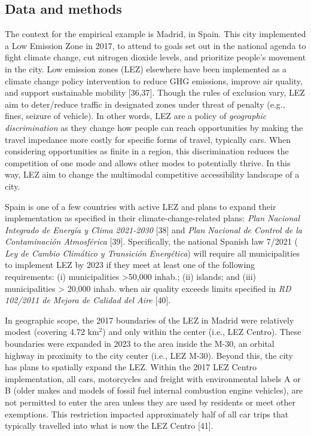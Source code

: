 \documentclass[10pt,letterpaper]{article}
\begin{document}
\hypertarget{data-and-methods}{%
\subsection{Data and methods}\label{data-and-methods}}

The context for the empirical example is Madrid, in Spain. This city
implemented a Low Emission Zone in 2017, to attend to goals set out in
the national agenda to fight climate change, cut nitrogen dioxide
levels, and prioritize people's movement in the city. Low emission zones
(LEZ) elsewhere have been implemented as a climate change policy
intervention to reduce GHG emissions, improve air quality, and support
sustainable mobility {[}36,37{]}. Though the rules of exclusion vary,
LEZ aim to deter/reduce traffic in designated zones under threat of
penalty (e.g., fines, seizure of vehicle). In other words, LEZ are a
policy of \emph{geographic discrimination} as they change how people can
reach opportunities by making the travel impedance more costly for
specific forms of travel, typically cars. When considering opportunities
as finite in a region, this discrimination reduces the competition of
one mode and allows other modes to potentially thrive. In this way, LEZ
aim to change the multimodal competitive accessibility landscape of a
city.

Spain is one of a few countries with active LEZ and plans to expand
their implementation as specified in their climate-change-related plans:
\emph{Plan Nacional Integrado de Energía y Clima 2021-2030} {[}38{]} and
\emph{Plan Nacional de Control de la Contaminación Atmosférica}
{[}39{]}. Specifically, the national Spanish law 7/2021 ( \emph{Ley de
Cambio Climático y Transición Energética}) will require all
municipalities to implement LEZ by 2023 if they meet at least one of the
following requirements: (i) municipalities \textgreater50,000 inhab.;
(ii) islands; and (iii) municipalities \textgreater{} 20,000 inhab. when
air quality exceeds limits specified in \emph{RD 102/2011 de Mejora de
Calidad del Aire} {[}40{]}.

In geographic scope, the 2017 boundaries of the LEZ in Madrid were
relatively modest (covering 4.72 km\(^2\)) and only within the center
(i.e., LEZ Centro). These boundaries were expanded in 2023 to the area
inside the M-30, an orbital highway in proximity to the city center
(i.e., LEZ M-30). Beyond this, the city has plans to spatially expand
the LEZ. Within the 2017 LEZ Centro implementation, all cars,
motorcycles and freight with environmental labels A or B (older makes
and models of fossil fuel internal combustion engine vehicles), are not
permitted to enter the area unless they are used by residents or meet
other exemptions. This restriction impacted approximately half of all
car trips that typically travelled into what is now the LEZ Centro
{[}41{]}.
\end{document}
